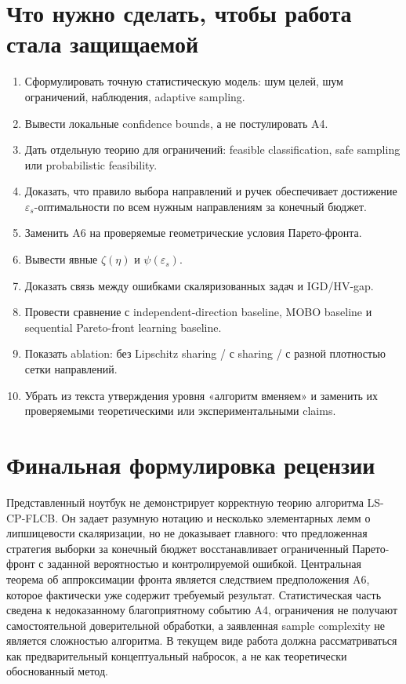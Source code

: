 \documentclass[11pt,a4paper]{article}
\begin{document}
\section{Что нужно сделать, чтобы работа стала защищаемой}

\begin{enumerate}
    \item Сформулировать точную статистическую модель: шум целей, шум ограничений, наблюдения, adaptive sampling.
    \item Вывести локальные confidence bounds, а не постулировать A4.
    \item Дать отдельную теорию для ограничений: feasible classification, safe sampling или probabilistic feasibility.
    \item Доказать, что правило выбора направлений и ручек обеспечивает достижение $\varepsilon_s$-оптимальности по всем нужным направлениям за конечный бюджет.
    \item Заменить A6 на проверяемые геометрические условия Парето-фронта.
    \item Вывести явные $\zeta(\eta)$ и $\psi(\varepsilon_s)$.
    \item Доказать связь между ошибками скаляризованных задач и IGD/HV-gap.
    \item Провести сравнение с independent-direction baseline, MOBO baseline и sequential Pareto-front learning baseline.
    \item Показать ablation: без Lipschitz sharing / с sharing / с разной плотностью сетки направлений.
    \item Убрать из текста утверждения уровня «алгоритм вменяем» и заменить их проверяемыми теоретическими или экспериментальными claims.
\end{enumerate}

\section*{Финальная формулировка рецензии}

Представленный ноутбук не демонстрирует корректную теорию алгоритма LS-CP-FLCB. Он задает разумную нотацию и несколько элементарных лемм о липшицевости скаляризации, но не доказывает главного: что предложенная стратегия выборки за конечный бюджет восстанавливает ограниченный Парето-фронт с заданной вероятностью и контролируемой ошибкой. Центральная теорема об аппроксимации фронта является следствием предположения A6, которое фактически уже содержит требуемый результат. Статистическая часть сведена к недоказанному благоприятному событию A4, ограничения не получают самостоятельной доверительной обработки, а заявленная sample complexity не является сложностью алгоритма. В текущем виде работа должна рассматриваться как предварительный концептуальный набросок, а не как теоретически обоснованный метод.
\end{document}
